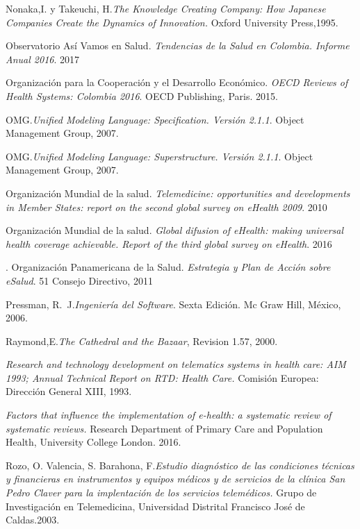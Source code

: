 \begin{thebibliography}{}
 Nonaka,I. y Takeuchi, H.\textit{The Knowledge Creating Company: How Japanese Companies Create the Dynamics of Innovation.} Oxford University Press,1995.

 Observatorio Así Vamos en Salud. \textit{Tendencias de la Salud en Colombia. Informe Anual 2016}. 2017

 Organización para la Cooperación y el Desarrollo Económico. \textit{OECD Reviews of Health Systems: Colombia 2016}. OECD Publishing, Paris. 2015.

 OMG.\textit{Unified Modeling Language: Specification. Versión 2.1.1}. Object Management Group, 2007.

 OMG.\textit{Unified Modeling Language: Superstructure. Versión 2.1.1}. Object Management Group, 2007.

 Organización Mundial de la salud. \textit{Telemedicine: opportunities and developments in Member States: report on the second global survey on eHealth 2009}. 2010

 Organización Mundial de la salud. \textit{Global difusion of eHealth: making universal health coverage achievable. Report of the third global survey on eHealth}. 2016

. Organización Panamericana de la Salud. \textit{Estrategia y Plan de Acción sobre eSalud}. 51 Consejo Directivo, 2011

 Pressman, R.~J.\textit{Ingeniería del Software}. Sexta Edición. Mc Graw 
Hill, México, 2006.

 Raymond,E.\textit{The Cathedral and the Bazaar}, Revision 1.57, 2000.

 \textit{Research and technology development on telematics systems in health care: AIM 1993; Annual Technical Report on RTD: Health Care.} Comisión Europea: Dirección General XIII, 1993.

 \textit{Factors that influence the implementation of e-health: a systematic review of systematic reviews.} Research Department of Primary Care and Population Health, University College London. 2016.

 Rozo, O. Valencia, S. Barahona, F.\textit{Estudio diagnóstico de las condiciones técnicas y financieras en instrumentos y equipos médicos  y de servicios de la clínica San Pedro Claver para la implentación de los servicios telemédicos.} Grupo de Investigación en Telemedicina,  Universidad Distrital Francisco José de Caldas.2003.


\end{thebibliography}
